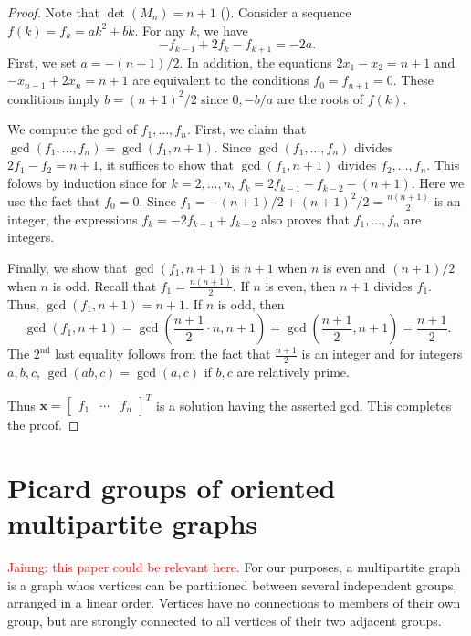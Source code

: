 \documentclass[11pt,reqno]{amsart}
\theoremstyle{definition}
\theoremstyle{plain}
\begin{document}
\begin{proof}
Note that $\det (M_n) = n+1$ (). 
Consider a sequence $f(k)=f_k  = ak^2 + bk$. 
For any $k$, we have
\[
-f_{k-1} + 2f_k - f_{k+1} = -2a.
\]
First, we set $a = -(n+1)/2$. 
In addition, the equations $2x_1 - x_2 = n+1$ and $-x_{n-1} + 2x_n = n+1$ are equivalent to the conditions $f_0 = f_{n+1} = 0$. 
These conditions imply $b = (n+1)^2/2$ since $0, -b/a$ are the roots of $f(k)$. 

We compute the gcd of $f_1,\dots, f_n$. 
First, we claim that $\gcd(f_1,\dots, f_n) = \gcd(f_1, n+1)$. 
Since $\gcd(f_1,\dots, f_n)$ divides $2f_1-f_2 = n+1$, 
it suffices to show that $\gcd(f_1, n+1)$ divides $f_2,\dots, f_n$. 
This folows by induction since for $k = 2, \dots, n$, 
$f_k = 2 f_{k-1} - f_{k-2} - (n+1)$.
Here we use the fact that $f_0 = 0$. 
Since $f_1 =  -(n+1)/2 + (n+1)^2/2 = \frac{n(n+1)}2$ is an integer, the expressions $f_k = -2 f_{k-1} + f_{k-2}$ also proves that $f_1, \dots, f_n$ are integers. 

Finally, we show that $\gcd(f_1, n+1)$ is $n+1$ when $n$ is even and $(n+1)/2$ when $n$ is odd. 
Recall that $f_1 = \frac{n(n+1)}2$.
If $n$ is even, then $n+1$ divides $f_1$. 
Thus, $\gcd(f_1, n+1) = n+1$. 
If $n$ is odd, then 
\[
\gcd(f_1, n+1) = \gcd(\frac{n+1}2 \cdot n, n+1) = \gcd(\frac{n+1}2, n+1) = \frac{n+1}2.
\] 
The $2^\textrm{nd}$ last equality follows from the fact that $\frac{n+1}2$ is an integer and for integers $a,b,c$, $\gcd(ab,c) = \gcd(a,c)$ if $b,c$ are relatively prime. 

Thus $\mathbf{x} = \begin{bmatrix} f_1 & \cdots & f_n \end{bmatrix}^T$ is a solution having the asserted gcd. 
This completes the proof. 
\end{proof}



\section{Picard groups of oriented multipartite graphs}
\textcolor{red}{Jaiung: this paper \cite{jacobson2003critical} could be relevant here.}
	For our purposes, a multipartite graph is a graph whos vertices can be partitioned between several independent
	groups, arranged in a linear order.  Vertices have no connections to members of their own group, but are strongly
	connected to all vertices of their two adjacent groups.
\end{document}
